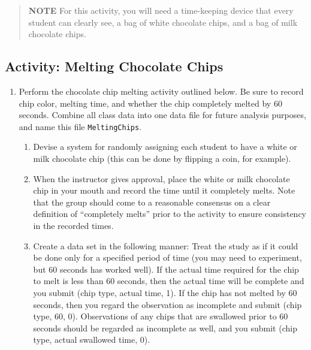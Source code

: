\documentclass[
]{book}
\providecommand{\tightlist}{%
  \setlength{\itemsep}{0pt}\setlength{\parskip}{0pt}}
\begin{document}
\begin{quote}
\textbf{NOTE}
For this activity, you will need a time-keeping device that every student can clearly see, a bag of white chocolate chips, and a bag of milk chocolate chips.
\end{quote}

\hypertarget{activity-melting-chocolate-chips}{%
\subsection*{Activity: Melting Chocolate Chips}\label{activity-melting-chocolate-chips}}

\begin{enumerate}
\def\labelenumi{\arabic{enumi}.}
\tightlist
\item
  Perform the chocolate chip melting activity outlined below. Be sure to record chip color, melting time, and whether the chip completely melted by 60 seconds. Combine all class data into one data file for future analysis purposes, and name this file \texttt{MeltingChips}.

  \begin{enumerate}
  \def\labelenumii{\alph{enumii}.}
  \tightlist
  \item
    Devise a system for randomly assigning each student to have a white or milk chocolate chip (this can be done by flipping a coin, for example).\\
  \item
    When the instructor gives approval, place the white or milk chocolate chip in your mouth and record the time until it completely melts. Note that the group should come to a reasonable consensus on a clear definition of ``completely melts'' prior to the activity to ensure consistency in the recorded times.\\
  \item
    Create a data set in the following manner: Treat the study as if it could be done only for a specified period of time (you may need to experiment, but 60 seconds has worked well). If the actual time required for the chip to melt is less than 60 seconds, then the actual time will be complete and you submit (chip type, actual time, 1). If the chip has not melted by 60 seconds, then you regard the observation as incomplete and submit (chip type, 60, 0). Observations of any chips that are swallowed prior to 60 seconds should be regarded as incomplete as well, and you submit (chip type, actual swallowed time, 0).
  \end{enumerate}
\end{enumerate}
\end{document}
